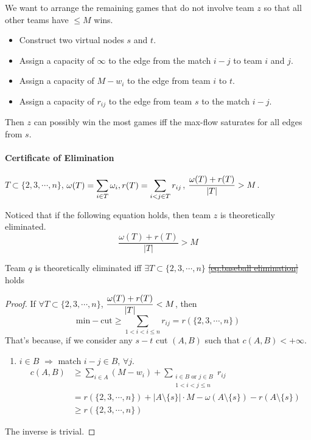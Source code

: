     We want to arrange the remaining games that do not involve team  $ z $ so that all other teams have  $  \leq M $ wins.

    \begin{itemize}
        \item Construct two virtual nodes  $ s $ and  $ t $.
        \item Assign a capacity of  $ \infty $ to the edge from  the match  $ i-j $ to team $ i $ and  $ j $.     
        \item Assign a capacity of  $ M-w_i $ to the edge from team  $ i $ to  $ t $.
        \item Assign a capacity of  $ r_{ij} $ to the edge from team  $ s $ to the match  $ i-j $.
    \end{itemize}
    Then  $ z $ can possibly win the most games iff the max-flow saturates for all edges from  $ s $.  



    \paragraph{Certificate of Elimination}
    $ T\subset\{2,3,\cdots,n\} $,  $ \omega(T)=\displaystyle\sum_{i\in T}\omega_i,r(T)=\sum_{i<j\in T}r_{ij} $,  $ \displaystyle\frac{\omega(T)+r(T)}{|T|}>M $.

    Noticed that if the following equation holds, then team  $ z $ is theoretically eliminated.
    \begin{equation}
        \frac{\omega(T)+r(T)}{|T|}>M\label{eq:baseball elimination}
    \end{equation}

    \begin{theorem}
        Team  $ q $  is theoretically eliminated iff  $ \exists T\subset\{2,3,\cdots, n\} $ \st \eqref{eq:baseball elimination} holds 
    \end{theorem}
    \begin{proof}
        If  $ \forall T\subset \{2,3,\cdots, n\} $,  $ \displaystyle\frac{\omega(T)+r(T)}{|T|}<M $, then 
        \[\mathrm{min-cut} \geq \sum_{1<i<i \leq n}r_{ij}=r(\{2,3,\cdots, n\})\] 
        That's because, if we consider any  $ s-t $ cut  $ (A,B)  $ such that  $ c(A,B)<+\infty $.
        \begin{enumerate}[label=\arabic*)]
            \item  $ i\in B $ $ \Rightarrow  $ match $ i-j\in B $,  $ \forall j $.    
            \begin{align*}
                c(A,B)& \geq \sum_{i\in A}(M-w_i)+\sum_{\substack{i\in B\text{ or }j\in B\\1<i<j \leq n}}r_{ij}\\
                &=r(\{2,3,\cdots,n\})+|A\setminus\{s\}|\cdot M-\omega(A\setminus\{s\})-r(A\setminus\{s\})\\
                & \geq r(\{2,3,\cdots,n\})
            \end{align*}
        \end{enumerate}  
        The inverse is trivial.
    \end{proof}

